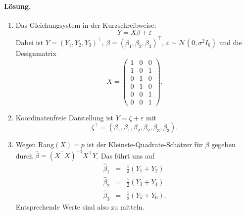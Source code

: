 \paragraph*{Lösung.}
\begin{enumerate}

    \item Das Gleichungsystem in der Kurzschreibweise:
        \begin{equation}
            Y = X \beta + \varepsilon
        \end{equation}
        Dabei ist $Y= \left( Y_1,Y_2,Y_3 \right)^\top$, $\beta = \left( \beta_1,\beta_2,\beta_3 \right)^\top$,
        $\varepsilon \sim\mathcal N\left( 0, \sigma^2 I_6 \right)$
        und die Designmatrix
        \begin{equation}
            X = \left( {\begin{array}{ccc} 1&0&0\\ 1&0&1\\ 0&1&0\\ 0&1&0\\ 0&0&1\\ 0&0&1 \end{array}   } \right).
        \end{equation}

    \item Koordinatenfreie Darstellung ist $Y = \zeta + \varepsilon$ mit 
        \begin{equation}
            \zeta^\top = \left( \beta_1,\beta_1,\beta_2,\beta_2,\beta_3,\beta_3 \right).
        \end{equation}

    \item Wegen Rang$(X)=p$ ist der Kleinste-Quadrate-Schätzer für $\beta$ gegeben durch 
        $\hat \beta = \left( X^\top X \right)^{-1} X^\top Y$. Das führt uns auf 
        \begin{eqnarray}
            \hat\beta_1 &=&  \frac{1}{2} \left( Y_1+Y_2 \right)    \\
            \hat\beta_2 &=&  \frac{1}{2} \left( Y_3+Y_4 \right)    \\
            \hat\beta_3 &=&  \frac{1}{2} \left( Y_5+Y_6 \right).
        \end{eqnarray}
        Entsprechende Werte sind also zu mitteln.
        

\end{enumerate}



